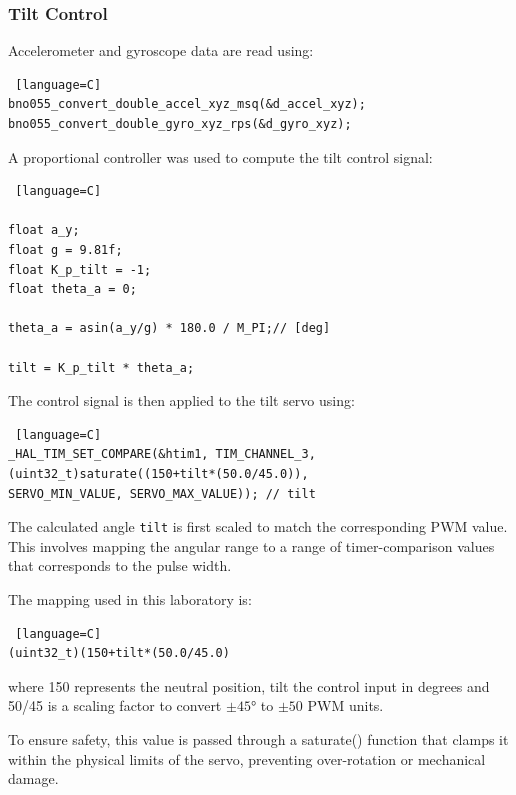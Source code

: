 \subsubsection{Tilt Control}

Accelerometer and gyroscope data are read using: 

\begin{lstlisting} [language=C]
bno055_convert_double_accel_xyz_msq(&d_accel_xyz); 
bno055_convert_double_gyro_xyz_rps(&d_gyro_xyz);
\end{lstlisting}

A proportional controller was used to compute the tilt control signal:

\begin{lstlisting} [language=C]

float a_y;
float g = 9.81f;
float K_p_tilt = -1;
float theta_a = 0;

theta_a = asin(a_y/g) * 180.0 / M_PI;// [deg]

tilt = K_p_tilt * theta_a;

\end{lstlisting}


The control signal is then applied to the tilt servo using: 

\begin{lstlisting} [language=C]
_HAL_TIM_SET_COMPARE(&htim1, TIM_CHANNEL_3,(uint32_t)saturate((150+tilt*(50.0/45.0)), 
SERVO_MIN_VALUE, SERVO_MAX_VALUE)); // tilt
\end{lstlisting}

The calculated angle \texttt{tilt} is first scaled to match the corresponding PWM value. This involves mapping the angular range to a range of timer-comparison values that corresponds to the pulse width.  

The mapping used in this laboratory is: 
\begin{lstlisting} [language=C]
(uint32_t)(150+tilt*(50.0/45.0)
\end{lstlisting}

where 150 represents the neutral position, tilt the control input in degrees and 50/45 is a scaling factor to convert $\pm 45$° to $\pm 50$ PWM units. 

To ensure safety, this value is passed through a saturate() function that clamps it within the physical limits of the servo, preventing over-rotation or mechanical damage. 



